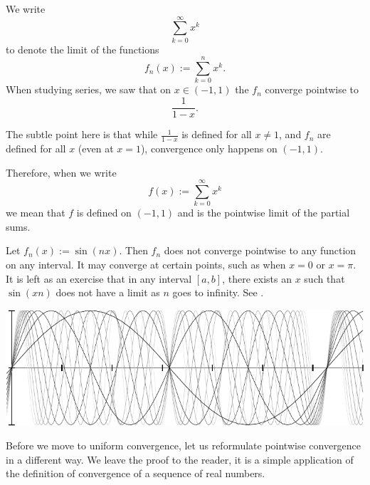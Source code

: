 \begin{example} \label{example:geomsumptconv}
We write
\begin{equation*}
\sum_{k=0}^\infty x^k
\end{equation*}
to denote the limit of the functions
\begin{equation*}
f_n(x) := \sum_{k=0}^n x^k .
\end{equation*}
When studying series, 
we saw that on $x \in (-1,1)$ the $f_n$ converge pointwise to
\begin{equation*}
\frac{1}{1-x} .
\end{equation*}

The subtle point here is that while
$\frac{1}{1-x}$ is defined for all $x \not=1$, and $f_n$ are 
defined for all $x$ (even at $x=1$), convergence only happens on $(-1,1)$.

Therefore, when we write
\begin{equation*}
f(x) := \sum_{k=0}^\infty x^k
\end{equation*}
we mean that $f$ is defined on $(-1,1)$ and is the pointwise limit
of the partial sums.
\end{example}

\begin{example}
Let $f_n(x) := \sin(nx)$.  Then $f_n$ does not converge pointwise
to any function on any interval.  It may converge at certain points, such
as when $x=0$ or $x=\pi$.  It is left as an exercise that in any interval
$[a,b]$, there exists an $x$ such that $\sin(xn)$ does not have a limit
as $n$ goes to infinity.  See .
\begin{myfigureht}
\includegraphics{figures/nonconvsinxn}
\caption{Graphs of $\sin(nx)$ for
$n=1,2,\ldots,10$, with higher $n$ in lighter gray.%
\label{fig:nonconvsinxn}}
\end{myfigureht}
\end{example}

Before we move to uniform convergence, let us reformulate pointwise
convergence in a different way.
We leave the proof to the reader, it is a simple application of the
definition of convergence of a sequence of real numbers.

